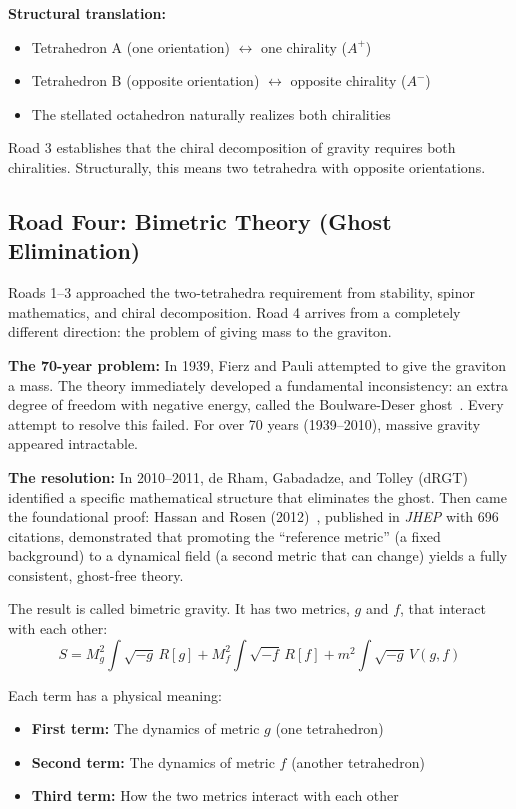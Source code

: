 \documentclass[aps,prd,preprint,superscriptaddress,showpacs,preprintnumbers,amsmath,amssymb,nofootinbib]{revtex4-2}
\begin{document}
\textbf{Structural translation:}
\begin{itemize}
\item Tetrahedron A (one orientation) $\leftrightarrow$ one chirality ($A^+$)
\item Tetrahedron B (opposite orientation) $\leftrightarrow$ opposite chirality ($A^-$)
\item The stellated octahedron naturally realizes both chiralities
\end{itemize}

Road 3 establishes that the chiral decomposition of gravity requires both chiralities. Structurally, this means two tetrahedra with opposite orientations.

\subsection{Road Four: Bimetric Theory (Ghost Elimination)}
\label{subsec:road-bimetric}

Roads 1--3 approached the two-tetrahedra requirement from stability, spinor mathematics, and chiral decomposition. Road 4 arrives from a completely different direction: the problem of giving mass to the graviton.

\textbf{The 70-year problem:} In 1939, Fierz and Pauli attempted to give the graviton a mass. The theory immediately developed a fundamental inconsistency: an extra degree of freedom with negative energy, called the Boulware-Deser ghost~\cite{boulware1972}. Every attempt to resolve this failed. For over 70 years (1939--2010), massive gravity appeared intractable.

\textbf{The resolution:} In 2010--2011, de Rham, Gabadadze, and Tolley (dRGT)~\cite{drgt2011} identified a specific mathematical structure that eliminates the ghost. Then came the foundational proof: Hassan and Rosen (2012)~\cite{hassan2012}, published in \emph{JHEP} with 696 citations, demonstrated that promoting the ``reference metric'' (a fixed background) to a dynamical field (a second metric that can change) yields a fully consistent, ghost-free theory.

The result is called bimetric gravity. It has two metrics, $g$ and $f$, that interact with each other:
\begin{equation}
S = M_g^2 \int\sqrt{-g}\, R[g] + M_f^2 \int\sqrt{-f}\, R[f] + m^2 \int\sqrt{-g}\, V(g,f)
\end{equation}

Each term has a physical meaning:
\begin{itemize}
\item \textbf{First term:} The dynamics of metric $g$ (one tetrahedron)
\item \textbf{Second term:} The dynamics of metric $f$ (another tetrahedron)
\item \textbf{Third term:} How the two metrics interact with each other
\end{itemize}
\end{document}
